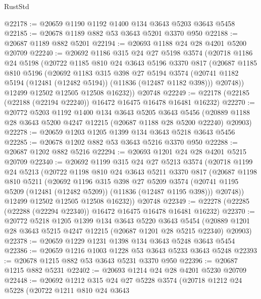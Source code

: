 \begin{lexlean}{RustStd}
\begin{coremodule}
@22178 := @20659 @1190 @1192 @1400 @134 @3643 @5203 @3643 @5458
@22185 := @20678 @1189 @882 @53 @3643 @5201 @3370 @950
@22188 := @20687 @1189 @882 @5201
@22194 := @20693 @1188 @24 @28 @4201 @5200 @20709
@22240 := @20692
    @1186
    @315
    @24
    @27
    @5198
    @3574
    (@20718
      @1186
      @24
      @5198
      (@20722
        @1185
        @810
        @24
        @3643
        @5196
        @3370
        @817
        (@20687
          @1185
          @810
          @5196
          (@20692
            @1183
            @315
            @398
            @27
            @5194
            @3574
            (@20741 @1182 @5194 (@12481 (@12482 @5194)) (@11836 (@12487 @1182 @398)))
            @20748))
        @12499
        @12502
        @12505
        @12508
        @16232))
    @20748
@22249 := @22178 (@22185 (@22188 (@22194 @22240)) @16472 @16475 @16478 @16481 @16232)
@22270 := @20772
    @5203
    @1192
    @1400
    @134
    @3643
    @5205
    @3643
    @5456
    (@20889 @1188 @28 @3643 @5200 @4247 @12215 (@20687 @1188 @28 @5200 @22240) @20903)
@22278 := @20659 @1203 @1205 @1399 @134 @3643 @5218 @3643 @5456
@22285 := @20678 @1202 @882 @53 @3643 @5216 @3370 @950
@22288 := @20687 @1202 @882 @5216
@22294 := @20693 @1201 @24 @28 @4201 @5215 @20709
@22340 := @20692
    @1199
    @315
    @24
    @27
    @5213
    @3574
    (@20718
      @1199
      @24
      @5213
      (@20722
        @1198
        @810
        @24
        @3643
        @5211
        @3370
        @817
        (@20687
          @1198
          @810
          @5211
          (@20692
            @1196
            @315
            @398
            @27
            @5209
            @3574
            (@20741 @1195 @5209 (@12481 (@12482 @5209)) (@11836 (@12487 @1195 @398)))
            @20748))
        @12499
        @12502
        @12505
        @12508
        @16232))
    @20748
@22349 := @22278 (@22285 (@22288 (@22294 @22340)) @16472 @16475 @16478 @16481 @16232)
@22370 := @20772
    @5218
    @1205
    @1399
    @134
    @3643
    @5220
    @3643
    @5454
    (@20889 @1201 @28 @3643 @5215 @4247 @12215 (@20687 @1201 @28 @5215 @22340) @20903)
@22378 := @20659 @1229 @1231 @1398 @134 @3643 @5248 @3643 @5454
@22386 := @20659 @1216 @1003 @1228 @53 @3643 @5233 @3643 @5248
@22393 := @20678 @1215 @882 @53 @3643 @5231 @3370 @950
@22396 := @20687 @1215 @882 @5231
@22402 := @20693 @1214 @24 @28 @4201 @5230 @20709
@22448 := @20692
    @1212
    @315
    @24
    @27
    @5228
    @3574
    (@20718
      @1212
      @24
      @5228
      (@20722
        @1211
        @810
        @24
        @3643

\end{coremodule}
\end{lexlean}
